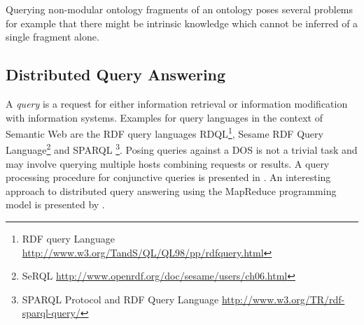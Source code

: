 Querying non-modular ontology fragments of
an ontology poses several problems for example that there might be intrinsic
knowledge which cannot be inferred of a single fragment alone.

\subsection{Distributed Query Answering}
A \emph{query} is a request for either information retrieval or information modification with
information systems. Examples for query languages in the context of Semantic Web
are the RDF query languages RDQL\footnote{RDF query Language 
\url{http://www.w3.org/TandS/QL/QL98/pp/rdfquery.html}}, Sesame RDF Query Language\footnote{SeRQL
\url{http://www.openrdf.org/doc/sesame/users/ch06.html}} and SPARQL
\footnote{SPARQL Protocol and RDF Query Language \url{http://www.w3.org/TR/rdf-sparql-query/}}.
Posing queries against a DOS is not a trivial task and may involve querying multiple hosts combining
requests or results. A query processing procedure for conjunctive queries is presented in \cite{chen08}.
An interesting approach to distributed query answering using the MapReduce
programming model is presented by \cite{alvarez2010}.
